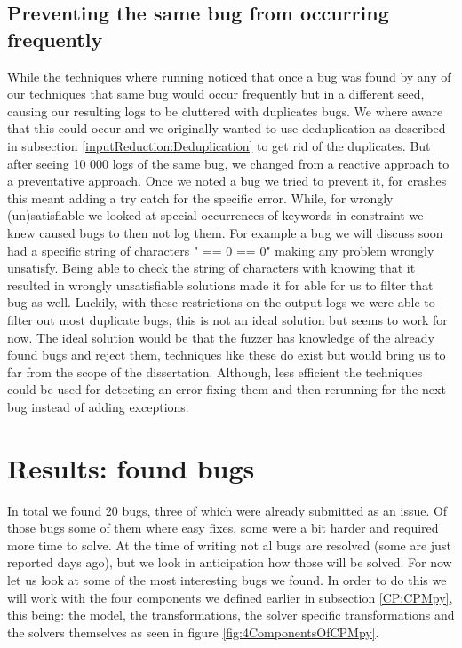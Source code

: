 \subsection{Preventing the same bug from occurring frequently}
While the techniques where running noticed that once a bug was found by any of our techniques that same bug would occur frequently but in a different seed, causing our resulting logs to be cluttered with duplicates bugs. We where aware that this could occur and we originally wanted to use deduplication as described in subsection \ref{inputReduction:Deduplication} to get rid of the duplicates. But after seeing 10 000 logs of the same bug, we changed from a reactive approach to a preventative approach. Once we noted a bug we tried to prevent it, for crashes this meant adding a try catch for the specific error. While, for wrongly (un)satisfiable we looked at special occurrences of keywords in constraint we knew caused bugs to then not log them. For example a bug we will discuss soon had a specific string of characters " == 0 == 0" making any problem wrongly unsatisfy. Being able to check the string of characters with knowing that it resulted in wrongly unsatisfiable  solutions made it for able for us to filter that bug as well. Luckily, with these restrictions on the output logs we were able to filter out most duplicate bugs, this is not an ideal solution but seems to work for now. The ideal solution would be that the fuzzer has knowledge of the already found bugs and reject them, techniques like these do exist but would bring us to far from the scope of the dissertation. Although, less efficient the techniques could be used for detecting an error fixing them and then rerunning for the next bug instead of adding exceptions.

\section{Results: found bugs}
\label{res:bugs}
In total we found 20 bugs, three of which were already submitted as an issue. Of those bugs some of them where easy fixes, some were a bit harder and required more time to solve. At the time of writing not al bugs are resolved (some are just reported days ago), but we look in anticipation how those will be solved. For now let us look at some of the most interesting bugs we found. In order to do this we will work with the four components we defined earlier in subsection \ref{CP:CPMpy}, this being: the model, the transformations, the solver specific transformations and the solvers themselves as seen in figure \ref{fig:4ComponentsOfCPMpy}.

